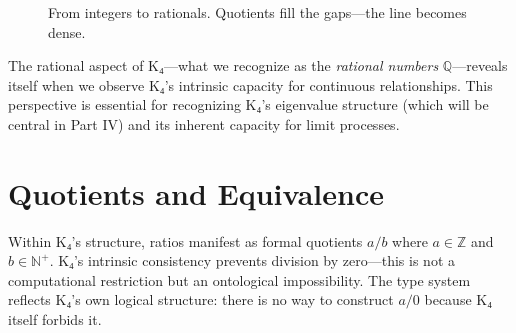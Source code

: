 \documentclass[11pt,a4paper]{book}
\begin{document}
\begin{figure}[h]
\centering
{}
\caption{From integers to rationals. Quotients fill the gaps—the line becomes dense.}
\label{fig:rationals-dense}
\end{figure}

The rational aspect of K₄—what we recognize as the \emph{rational numbers} $\mathbb{Q}$—reveals itself when we observe K₄'s intrinsic capacity for continuous relationships. This perspective is essential for recognizing K₄'s eigenvalue structure (which will be central in Part IV) and its inherent capacity for limit processes.

\section{Quotients and Equivalence}

Within K₄'s structure, ratios manifest as formal quotients $a/b$ where $a \in \mathbb{Z}$ and $b \in \mathbb{N}^+$. K₄'s intrinsic consistency prevents division by zero—this is not a computational restriction but an ontological impossibility. The type system reflects K₄'s own logical structure: there is no way to construct $a/0$ because K₄ itself forbids it.
\end{document}
